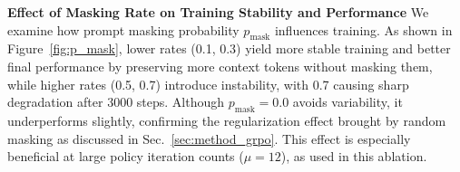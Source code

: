 \textbf{Effect of Masking Rate on Training Stability and Performance} We examine how prompt masking probability $p_{\text{mask}}$ influences \grpo{} training. As shown in Figure~\ref{fig:p_mask}, lower rates (0.1, 0.3) yield more stable training and better final performance by preserving more context tokens without masking them, while higher rates (0.5, 0.7) introduce instability, with 0.7 causing sharp degradation after 3000 steps. Although $p_{\text{mask}}=0.0$ avoids variability, it underperforms slightly, confirming the  regularization effect brought by random masking as discussed in Sec.~\ref{sec:method_grpo}. This effect is especially beneficial at large policy iteration counts ($\mu=12$), as used in this ablation.
